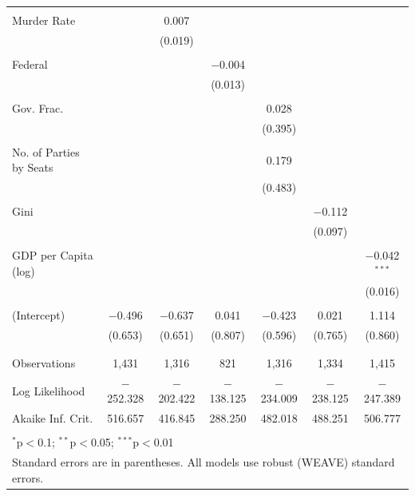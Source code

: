 \documentclass[a4paper]{article}\usepackage[]{graphicx}\usepackage[]{color}
\begin{document}
\begin{table}
\begin{center}
{\begin{tabular}{@{\extracolsep{5pt}}lcccccc}
  & & & & & & \\ 
 Murder Rate &  & 0.007 &  &  &  &  \\ 
  &  & (0.019) &  &  &  &  \\ 
  & & & & & & \\ 
 Federal &  &  & $-$0.004 &  &  &  \\ 
  &  &  & (0.013) &  &  &  \\ 
  & & & & & & \\ 
 Gov. Frac. &  &  &  & 0.028 &  &  \\ 
  &  &  &  & (0.395) &  &  \\ 
  & & & & & & \\ 
 No. of Parties by Seats &  &  &  & 0.179 &  &  \\ 
  &  &  &  & (0.483) &  &  \\ 
  & & & & & & \\ 
 Gini &  &  &  &  & $-$0.112 &  \\ 
  &  &  &  &  & (0.097) &  \\ 
  & & & & & & \\ 
 GDP per Capita (log) &  &  &  &  &  & $-$0.042$^{***}$ \\ 
  &  &  &  &  &  & (0.016) \\ 
  & & & & & & \\ 
 (Intercept) & $-$0.496 & $-$0.637 & 0.041 & $-$0.423 & 0.021 & 1.114 \\ 
  & (0.653) & (0.651) & (0.807) & (0.596) & (0.765) & (0.860) \\ 
  & & & & & & \\ 
\hline \\[-1.8ex] 
Observations & 1,431 & 1,316 & 821 & 1,316 & 1,334 & 1,415 \\ 
Log Likelihood & $-$252.328 & $-$202.422 & $-$138.125 & $-$234.009 & $-$238.125 & $-$247.389 \\ 
Akaike Inf. Crit. & 516.657 & 416.845 & 288.250 & 482.018 & 488.251 & 506.777 \\ 
\hline 
\hline \\[-1.8ex] 
\multicolumn{7}{l}{$^{*}$p$<$0.1; $^{**}$p$<$0.05; $^{***}$p$<$0.01} \\ 
\multicolumn{7}{l}{Standard errors are in parentheses. All models use robust (WEAVE) standard errors.} \\ 
\end{tabular} 

}
\end{center}
\end{table}
\end{document}
